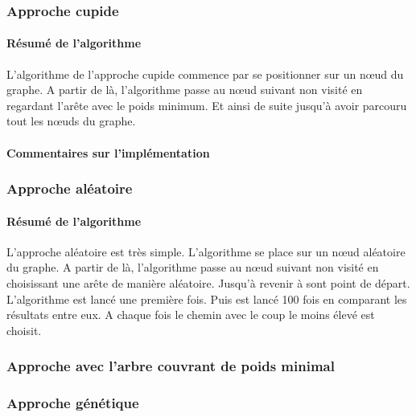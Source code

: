 \documentclass[10pt,a4paper]{report}
\begin{document}
		\subsubsection{Approche cupide}
		
		\paragraph{Résumé de l'algorithme\\}
		L'algorithme de l'approche cupide commence par se positionner sur un nœud du graphe. A partir de là, l'algorithme passe au nœud suivant non visité en regardant l'arête avec le poids minimum. Et ainsi de suite jusqu'à avoir parcouru tout les nœuds du graphe.
		
		\paragraph{Commentaires sur l'implémentation\\}
		
		\subsubsection{Approche aléatoire}
		
		\paragraph{Résumé de l'algorithme\\}
		L'approche aléatoire est très simple. L'algorithme se place sur un nœud aléatoire du graphe. A partir de là, l'algorithme passe au nœud suivant non visité en choisissant une arête de manière aléatoire. Jusqu'à revenir à sont point de départ.
		L'algorithme est lancé une première fois. Puis est lancé 100 fois en comparant les résultats entre eux. A chaque fois le chemin avec le coup le moins élevé est choisit.
		
		\subsubsection{Approche avec l'arbre couvrant de poids minimal}
		
		\subsubsection{Approche génétique}
		
\end{document}
